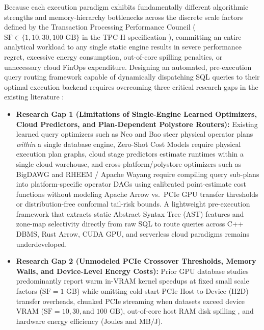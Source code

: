 \documentclass[10pt,a4paper]{article}
\begin{document}
Because each execution paradigm exhibits fundamentally different algorithmic strengths and memory-hierarchy bottlenecks across the discrete scale factors defined by the Transaction Processing Performance Council ($\text{SF} \in \{1, 10, 30, 100\text{ GB}\}$ in the TPC-H specification \cite{tpc2022tpch, boncz2014tpch, dreseler2020quantifying}), committing an entire analytical workload to any single static engine results in severe performance regret, excessive energy consumption, out-of-core spilling penalties, or unnecessary cloud FinOps expenditure. Designing an automated, pre-execution query routing framework capable of dynamically dispatching SQL queries to their optimal execution backend requires overcoming three critical research gaps in the existing literature \cite{ahmed2020hibench, oneil2009ssb, leis2015job}:
\begin{itemize}[leftmargin=1.5em,itemsep=2pt]
    \item \textbf{Research Gap 1 (Limitations of Single-Engine Learned Optimizers, Cloud Predictors, and Plan-Dependent Polystore Routers):} Existing learned query optimizers such as Neo \cite{marcus2019neo} and Bao \cite{marcus2021bao} steer physical operator plans \emph{within} a single database engine, Zero-Shot Cost Models \cite{hilprecht2022zeroshot} require physical execution plan graphs, cloud stage predictors \cite{ganapathi2009predicting, nathan2024stage} estimate runtimes within a single cloud warehouse, and cross-platform/polystore optimizers such as BigDAWG \cite{tan2023stage} and RHEEM / Apache Wayang \cite{gupta2023adaptive} require compiling query sub-plans into platform-specific operator DAGs using calibrated point-estimate cost functions without modeling Apache Arrow vs.\ PCIe GPU transfer thresholds or distribution-free conformal tail-risk bounds. A lightweight pre-execution framework that extracts static Abstract Syntax Tree (AST) features and zone-map selectivity directly from raw SQL to route queries across C++ DBMS, Rust Arrow, CUDA GPU, and serverless cloud paradigms remains underdeveloped.
    \item \textbf{Research Gap 2 (Unmodeled PCIe Crossover Thresholds, Memory Walls, and Device-Level Energy Costs):} Prior GPU database studies \cite{shanbhag2020crystal, root2019mapd, kim2022blazingsql} predominantly report warm in-VRAM kernel speedups at fixed small scale factors ($\text{SF}=1\text{ GB}$) while omitting cold-start PCIe Host-to-Device (H2D) transfer overheads, chunked PCIe streaming when datasets exceed device VRAM ($\text{SF}=10, 30, \text{and } 100\text{ GB}$), out-of-core host RAM disk spilling \cite{kuiper2024duckdb_ooc}, and hardware energy efficiency ($\text{Joules}$ and $\text{MB/J}$).

\end{itemize}
\end{document}
